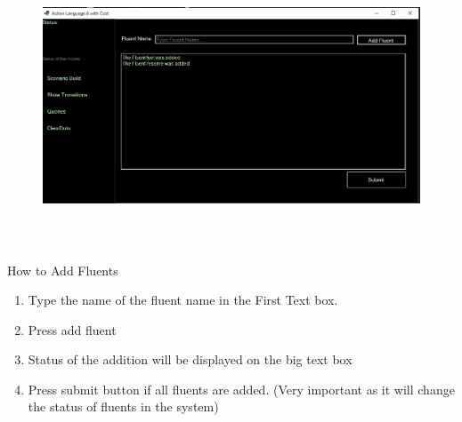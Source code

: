 \documentclass[12pt]{article}
\begin{document}
\vspace{\baselineskip}



\begin{figure}[H]
	\begin{Center}
		\includegraphics[width=6.27in,height=3.27in]{./media/image5.jpeg}
	\end{Center}
\end{figure}



\par


\vspace{\baselineskip}
How to Add Fluents\par


\vspace{\baselineskip}
\begin{enumerate}
	\item Type the name of the fluent name in the First Text box.\par

	\item Press add fluent\par

	\item Status of the addition will be displayed on the big text box\par

	\item Press submit button if all fluents are added. (Very important as it will change the status of fluents in the system)
\end{enumerate}\par
\end{document}
